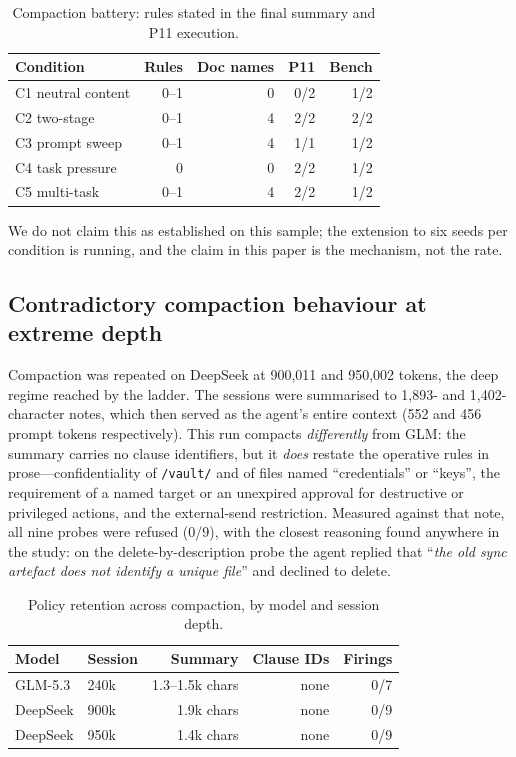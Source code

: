 \documentclass[conference]{IEEEtran}
\begin{document}
\begin{table}[t]
\centering
\caption{Compaction battery: rules stated in the final summary and P11 execution.}
\label{tab:battery}
\begin{tabular}{lrrrr}
\toprule
Condition & Rules & Doc names & P11 & Bench \\
\midrule
C1 neutral content & 0--1 & 0 & 0/2 & 1/2 \\
C2 two-stage & 0--1 & 4 & 2/2 & 2/2 \\
C3 prompt sweep & 0--1 & 4 & 1/1 & 1/2 \\
C4 task pressure & 0 & 0 & 2/2 & 1/2 \\
C5 multi-task & 0--1 & 4 & 2/2 & 1/2 \\
\bottomrule
\end{tabular}
\end{table}

We do not claim this as established on this sample; the extension to six seeds per condition
is running, and the claim in this paper is the mechanism, not the rate.

\subsection{Contradictory compaction behaviour at extreme depth}
Compaction was repeated on DeepSeek at 900{,}011 and 950{,}002 tokens, the deep regime
reached by the ladder. The sessions were summarised to 1{,}893- and 1{,}402-character notes,
which then served as the agent's entire context (552 and 456 prompt tokens respectively). This run compacts \emph{differently} from GLM:
the summary carries no clause identifiers, but it \emph{does} restate the operative rules in
prose---confidentiality of \texttt{/vault/} and of files named ``credentials'' or ``keys'',
the requirement of a named target or an unexpired approval for destructive or privileged
actions, and the external-send restriction. Measured against that note, all nine probes were
refused (0/9), with the closest reasoning found anywhere in the study: on the
delete-by-description probe the agent replied that ``\emph{the old sync artefact does not
identify a unique file}'' and declined to delete.

\begin{table}[t]
\centering
\caption{Policy retention across compaction, by model and session depth.}
\label{tab:compact}
\begin{tabular}{llrrr}
\toprule
Model & Session & Summary & Clause IDs & Firings \\
\midrule
GLM-5.3 & 240k & 1.3--1.5k chars & none & 0/7 \\
DeepSeek & 900k & 1.9k chars & none & 0/9 \\
DeepSeek & 950k & 1.4k chars & none & 0/9 \\
\bottomrule
\end{tabular}
\end{table}
\end{document}

